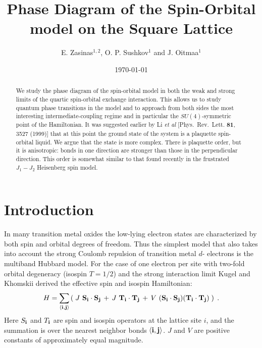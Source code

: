 

\sloppy
\draft
\title{Phase Diagram of the Spin-Orbital model on the Square Lattice}
\author{E. Zasinas$^{1,2}$, O. P. Sushkov$^1$ and J. Oitmaa$^1$}
\address{$^{1}$School of Physics, The University of New South Wales,\\
Sydney 2052, Australia\\
$^2$Vilnius University, Institute of Materials Science,\\
Sauletekio 9-III, Vilnius, 2040, Lithuania
}
\date{\today}
\maketitle
\begin{abstract}
We study the phase diagram of the spin-orbital model in both the weak
and strong limits of the quartic spin-orbital exchange interaction.
This allows us to study quantum phase transitions in the model and to  
approach from both sides the most interesting intermediate-coupling 
regime and in particular the $SU(4)$-symmetric point of the Hamiltonian. 
It was suggested earlier by Li {\it et al} [Phys.\ Rev.\ Lett. 
{\bf 81}, 3527 (1999)]  that at this point the ground state of the system
is a plaquette spin-orbital liquid. We argue that the state is more
complex. There is plaquette order, but it is anisotropic: bonds in one
direction are stronger than those in the perpendicular direction.
This order is somewhat similar to that found recently in the frustrated
$J_1-J_2$ Heisenberg spin model.
\end{abstract}

\section{Introduction}

In many transition metal oxides the low-lying electron states are
characterized by both spin and orbital degrees of freedom. 
Thus the simplest model that also takes into account the strong Coulomb 
repulsion of transition metal $d$- electrons is the multiband Hubbard 
model. For the case of one electron per site with two-fold orbital
degeneracy (isospin $T=1/2$) and the strong interaction limit Kugel and 
Khomskii \cite{kugel} derived the effective  spin and isospin Hamiltonian:
\begin{equation}
\label{model_hamilton}
H  = \sum_{\langle {\bf i,j} \rangle} 
\left ( \;
J \ {\bf S}_{\bf i} \cdot {\bf S}_{\bf j} \, + \,
J \ {\bf T}_{\bf i} \cdot {\bf T}_{\bf j}  \, + \,
V \ ( {\bf S}_{\bf i} \cdot {\bf S}_{\bf j} ) 
( {\bf T}_{\bf i} \cdot {\bf T}_{\bf j} )
\; \right) \; .
\end{equation}
Here $S_{\bf i}$ and $T_{\bf i}$ are spin and isospin operators
at the lattice site $i$, and the summation is over the nearest
neighbor bonds $\langle {\bf i,j} \rangle$. 
$J$ and $V$ are positive constants of approximately 
equal magnitude. 

